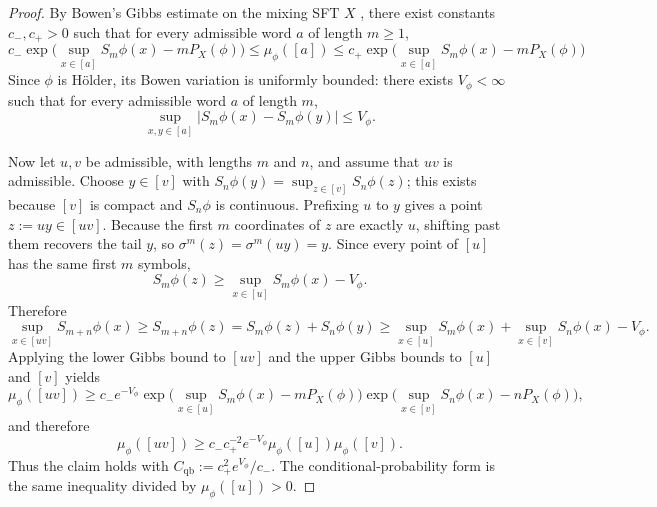 \documentclass{etds}%
\numberwithin{equation}{section}
\theoremstyle{plain}
\theoremstyle{definition}
\theoremstyle{remark}
\begin{document}
\begin{proof}
By Bowen's Gibbs estimate on the mixing SFT $X$
\cite{Bowen1975,WaltersErgodicTheory}, there exist constants $c_-,c_+>0$ such
that for every admissible word $a$ of length $m\ge 1$,
\[
c_-\exp\!\bigl(\sup_{x\in[a]}S_m\phi(x)-mP_X(\phi)\bigr)
\le \mu_\phi([a])
\le
c_+\exp\!\bigl(\sup_{x\in[a]}S_m\phi(x)-mP_X(\phi)\bigr)
\]
Since $\phi$ is H\"older, its Bowen
variation is uniformly bounded: there exists $V_\phi<\infty$ such that for
every admissible word $a$ of length $m$,
\[
\sup_{x,y\in[a]}|S_m\phi(x)-S_m\phi(y)|\le V_\phi.
\]

Now let $u,v$ be admissible, with lengths $m$ and $n$, and assume that $uv$ is
admissible.  Choose $y\in[v]$ with
$S_n\phi(y)=\sup_{z\in[v]}S_n\phi(z)$; this exists because $[v]$ is compact and
$S_n\phi$ is continuous.  Prefixing $u$ to $y$ gives a point $z:=uy\in[uv]$.
Because the first $m$ coordinates of $z$ are exactly $u$, shifting past them
recovers the tail $y$, so $\sigma^m(z)=\sigma^m(uy)=y$.
Since every point of $[u]$ has the same first $m$ symbols,
\[
S_m\phi(z)\ge \sup_{x\in[u]}S_m\phi(x)-V_\phi.
\]
Therefore
\[
\sup_{x\in[uv]}S_{m+n}\phi(x)
\ge S_{m+n}\phi(z)
=S_m\phi(z)+S_n\phi(y)
\ge \sup_{x\in[u]}S_m\phi(x)+\sup_{x\in[v]}S_n\phi(x)-V_\phi.
\]
Applying the lower Gibbs bound to $[uv]$ and the upper Gibbs bounds to $[u]$
and $[v]$ yields
\[
\mu_\phi([uv])
\ge c_-e^{-V_\phi}
\exp\!\bigl(\sup_{x\in[u]}S_m\phi(x)-mP_X(\phi)\bigr)
\exp\!\bigl(\sup_{x\in[v]}S_n\phi(x)-nP_X(\phi)\bigr),
\]
and therefore
\[
\mu_\phi([uv])\ge c_-c_+^{-2}e^{-V_\phi}\mu_\phi([u])\mu_\phi([v]).
\]
Thus the claim holds with
$C_{\mathrm{qb}}:=c_+^2e^{V_\phi}/c_-$.  The conditional-probability form is
the same inequality divided by $\mu_\phi([u])>0$.
\end{proof}
\end{document}
